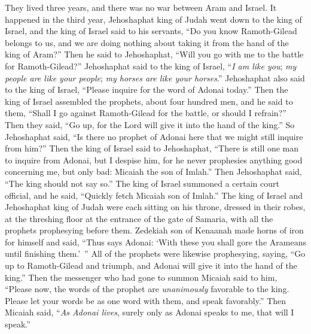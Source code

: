 \begin{biblechapter} %
 They lived three years, and there was no war between Aram and Israel.
\verse It happened in the third year, Jehoshaphat king of Judah went down to the king of Israel,
\verse and the king of Israel said to his servants, “Do you know Ramoth-Gilead belongs to us, and we are doing nothing about taking it from the hand of the king of Aram?”
\verse Then he said to Jehoshaphat, “Will you go with me to the battle for Ramoth-Gilead?” Jehoshaphat said to the king of Israel, “\textit{I am like you}; \textit{my people are like your people}; \textit{my horses are like your horses}.”
\verse Jehoshaphat also said to the king of Israel, “Please inquire for the word of Adonai today.”
\verse Then the king of Israel assembled the prophets, about four hundred men, and he said to them, “Shall I go against Ramoth-Gilead for the battle, or should I refrain?” Then they said, “Go up, for the Lord will give it into the hand of the king.”
\verse So Jehoshaphat said, “Is there no prophet of Adonai here that we might still inquire from him?”
\verse Then the king of Israel said to Jehoshaphat, “There is still one man to inquire from Adonai, but I despise him, for he never prophesies anything good concerning me, but only bad: Micaiah the son of Imlah.” Then Jehoshaphat said, “The king should not say so.”
\verse The king of Israel summoned a certain court official, and he said, “Quickly fetch Micaiah son of Imlah.”
\verse The king of Israel and Jehoshaphat king of Judah were each sitting on his throne, dressed in their robes, at the threshing floor at the entrance of the gate of Samaria, with all the prophets prophesying before them.
\verse Zedekiah son of Kenaanah made horns of iron for himself and said, “Thus says Adonai: ‘With these you shall gore the Arameans until finishing them.’ ”
\verse All of the prophets were likewise prophesying, saying, “Go up to Ramoth-Gilead and triumph, and Adonai will give it into the hand of the king.”
\verse Then the messenger who had gone to summon Micaiah said to him, “Please now, the words of the prophet are \textit{unanimously} favorable to the king. Please let your words be as one word with them, and speak favorably.”
\verse Then Micaiah said, “\textit{As Adonai lives}, surely only as Adonai speaks to me, that will I speak.”

\end{biblechapter}

